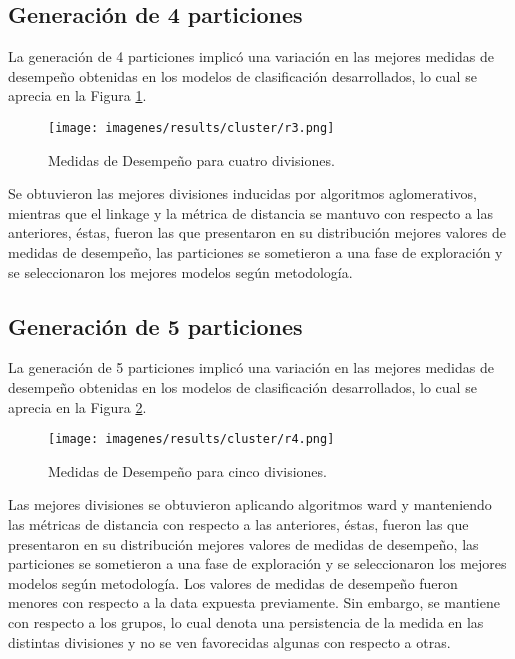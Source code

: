\subsection{Generaci\'on de 4 particiones}

La generaci\'on de 4 particiones implic\'o una variaci\'on en las mejores medidas de desempe\~no obtenidas en los modelos de clasificaci\'on desarrollados, lo cual se aprecia en la Figura \ref{cluster3}. 

\begin{figure}[!h]
	\centering
	\texttt{[image: imagenes/results/cluster/r3.png]}
	\caption{Medidas de Desempe\~no para cuatro divisiones.}
	\label{cluster3}
\end{figure}
	
Se obtuvieron las mejores divisiones inducidas por algoritmos aglomerativos, mientras que el linkage y la m\'etrica de distancia se mantuvo con respecto a las anteriores, \'estas, fueron las que presentaron en su distribuci\'on mejores valores de medidas de desempe\~no, las particiones se sometieron a una fase de exploraci\'on y se seleccionaron los mejores modelos seg\'un metodolog\'ia.

\subsection{Generaci\'on de 5 particiones}

La generaci\'on de 5 particiones implic\'o una variaci\'on en las mejores medidas de desempe\~no obtenidas en los modelos de clasificaci\'on desarrollados, lo cual se aprecia en la Figura \ref{cluster4}. 

\begin{figure}[!h]
	\centering
	\texttt{[image: imagenes/results/cluster/r4.png]}
	\caption{Medidas de Desempe\~no para cinco divisiones.}
	\label{cluster4}
\end{figure}

Las mejores divisiones se obtuvieron aplicando algoritmos ward  y manteniendo las m\'etricas de distancia con respecto a las anteriores, \'estas, fueron las que presentaron en su distribuci\'on mejores valores de medidas de desempe\~no, las particiones se sometieron a una fase de exploraci\'on y se seleccionaron los mejores modelos seg\'un metodolog\'ia. Los valores de medidas de desempe\~no fueron menores con respecto a la data expuesta previamente. Sin embargo, se mantiene con respecto a los grupos, lo cual denota una persistencia de la medida en las distintas divisiones y no se ven favorecidas algunas con respecto a otras.

